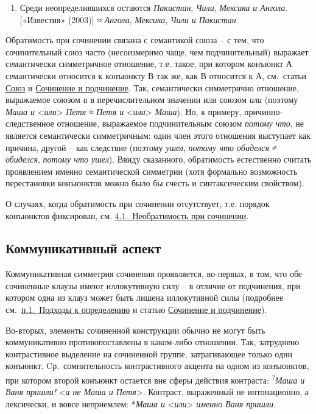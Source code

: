 \begin{enumerate}
\def\labelenumi{(\arabic{enumi})}
\setcounter{enumi}{23}
\item
  Среди неопределившихся остаются \emph{Пакистан}, \emph{Чили},
  \emph{Мексика и Ангола}. {[}«Известия» (2003){]} ≈ \emph{Ангола},
  \emph{Мексика}, \emph{Чили и Пакистан}
\end{enumerate}

Обратимость при сочинении связана с семантикой союза -- с тем, что
сочинительный союз часто (несоизмеримо чаще, чем подчинительный)
выражает семантически симметричное отношение, т.е. такое, при котором
конъюнкт А семантически относится к конъюнкту В так же, как В относится
к А, см.~статьи \underline{Союз} и \underline{Сочинение и подчинение}.
Так, семантически симметрично отношение, выражаемое союзом \emph{и} в
перечислительном значении или союзом \emph{или} (поэтому \emph{Маша и}
\textless{}\emph{или}\textgreater{} \emph{Петя} ≈ \emph{Петя и}
\textless{}\emph{или}\textgreater{} \emph{Маша}). Но, к примеру,
причинно-следственное отношение, выражаемое подчинительным союзом
\emph{потому что}, не является семантически симметричным: один член
этого отношения выступает как причина, другой -- как следствие (поэтому
\emph{ушел}, \emph{потому что обиделся} ≠ \emph{обиделся}, \emph{потому
что ушел}). Ввиду сказанного, обратимость естественно считать
проявлением именно семантической симметрии (хотя формально возможность
перестановки конъюнктов можно было бы счесть и синтаксическим
свойством).

О случаях, когда обратимость при сочинении отсутствует, т.е. порядок
конъюнктов фиксирован, см. \underline{4.1.~Необратимость при сочинении}.

\hypertarget{ux43aux43eux43cux43cux443ux43dux438ux43aux430ux442ux438ux432ux43dux44bux439-ux430ux441ux43fux435ux43aux442}{%
\subsection{Коммуникативный
аспект}\label{ux43aux43eux43cux43cux443ux43dux438ux43aux430ux442ux438ux432ux43dux44bux439-ux430ux441ux43fux435ux43aux442}}

Коммуникативная симметрия сочинения проявляется, во-первых, в том, что
обе сочиненные клаузы имеют иллокутивную силу -- в отличие от
подчинения, при котором одна из клауз может быть лишена иллокутивной
силы (подробнее см.~\underline{п.1.~Подходы к определению} и статью
\underline{Сочинение и подчинение}).

Во-вторых, элементы сочиненной конструкции обычно не могут быть
коммуникативно противопоставлены в каком-либо отношении. Так, затруднено
контрастивное выделение на сочиненной группе, затрагивающее только один
конъюнкт. Cр.~сомнительность контрастивного акцента на одном из
конъюнктов, при котором второй конъюнкт остается вне сферы действия
контраста: \textsuperscript{?}\emph{Маша и Ваня пришли!}
\textless{}\emph{а не Маша и Петя}\textgreater. Контраст, выраженный не
интонационно, а лексически, и вовсе неприемлем: *\emph{Маша и}
\textless{}\emph{или}\textgreater{} \emph{именно Ваня пришли}.

